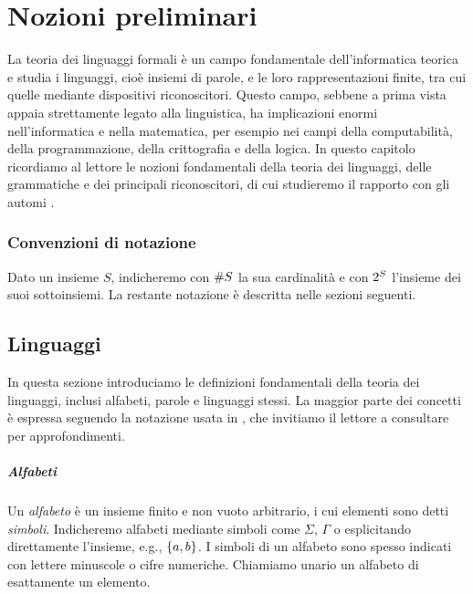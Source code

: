 \chapter{Nozioni preliminari}\label{cha:prel}
La teoria dei linguaggi formali è un campo fondamentale dell'informatica teorica e studia i linguaggi, cioè insiemi di parole, e le loro rappresentazioni finite, tra cui quelle mediante dispositivi riconoscitori. Questo campo, sebbene a prima vista appaia strettamente legato alla linguistica, ha implicazioni enormi nell'informatica e nella matematica, per esempio nei campi della computabilità, della programmazione, della crittografia e della logica. In questo capitolo ricordiamo al lettore le nozioni fondamentali della teoria dei linguaggi, delle grammatiche e dei principali riconoscitori, di cui studieremo il rapporto con gli automi .


\subsection*{Convenzioni di notazione}
Dato un insieme $S$, indicheremo con $\# S$ la sua cardinalità e con $2^{S}$ l'insieme dei suoi sottoinsiemi.
La restante notazione è descritta nelle sezioni seguenti.


\section{Linguaggi}
In questa sezione introduciamo le definizioni fondamentali della teoria dei linguaggi, inclusi alfabeti, parole e linguaggi stessi. La maggior parte dei concetti è espressa seguendo la notazione usata in \cite{Hopcroft:79:introLFA}, che invitiamo il lettore a consultare per approfondimenti.

\paragraph{Alfabeti} Un \emph{alfabeto} è un insieme finito e non vuoto arbitrario, i cui elementi sono detti \emph{simboli}. Indicheremo alfabeti mediante simboli come $\Sigma$, $\Gamma$ o esplicitando direttamente l'insieme, e.g., $\left\{ a,b \right\}$. I simboli di un alfabeto sono spesso indicati con lettere minuscole o cifre numeriche. Chiamiamo unario un alfabeto di esattamente un elemento.

